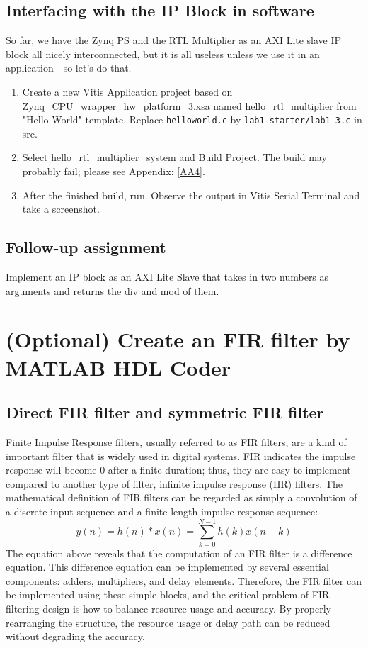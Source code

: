 \documentclass[a4paper,12pt,twoside]{article}
\begin{document}
\subsection{Interfacing with the IP Block in software}
So far, we have the Zynq PS and the RTL Multiplier as an AXI Lite slave IP block all nicely interconnected, but it is all useless unless we use it in an application - so let's do that.
\begin{enumerate}
    \item Create a new Vitis Application project based on Zynq\_CPU\_wrapper\_hw\_platform\_3.xsa named hello\_rtl\_multiplier from "Hello World" template. Replace \texttt{helloworld.c} by
    \texttt{lab1\_starter/lab1-3.c} in src.
    \item Select hello\_rtl\_multiplier\_system and Build Project. The build may probably fail; please see Appendix: \ref{AA4}.
    \item After the finished build, run. Observe the output in Vitis Serial Terminal and take a screenshot.
\end{enumerate}
\subsection{Follow-up assignment}
Implement an IP block as an AXI Lite Slave that takes in two numbers as arguments and returns the div and mod of them.

\newpage
\section{(Optional) Create an FIR filter by MATLAB HDL Coder}\label{Sopt1}
\subsection{Direct FIR filter and symmetric FIR filter}
Finite Impulse Response filters, usually referred to as FIR filters, are a kind of important filter that is widely used in digital systems. FIR indicates the impulse response will become 0 after a finite duration; thus, they are easy to implement compared to another type of filter, infinite impulse response (IIR) filters. The mathematical definition of FIR filters can be regarded as simply a convolution of a discrete input sequence and a finite length impulse response sequence:
\begin{equation}
    y(n) = h(n)*x(n) = \sum_{k=0}^{N-1}h(k)x(n-k)
\end{equation}
The equation above reveals that the computation of an FIR filter is a difference equation. This difference equation can be implemented by several essential components: adders, multipliers, and delay elements. Therefore, the FIR filter can be implemented using these simple blocks, and the critical problem of FIR filtering design is how to balance resource usage and accuracy. By properly rearranging the structure, the resource usage or delay path can be reduced without degrading the accuracy.
\end{document}
